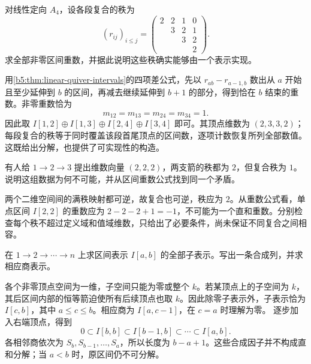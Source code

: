 \begin{exercise}\label{b5:ex:09-a4-rank-table}
	对线性定向 \(A_4\)，设各段复合的秩为
	\[
		(r_{ij})_{i\leq j}=
		\begin{pmatrix}
			2&2&1&0\\
			&3&2&1\\
			& &3&2\\
			& & &2
		\end{pmatrix}.
	\]
	求全部非零区间重数，并据此说明这些秩确实能够由一个表示实现。
\end{exercise}
\begin{solution}
	用\cref{b5:thm:linear-quiver-intervals}的四项差公式，先以 \(r_{ab}-r_{a-1,b}\) 数出从 \(a\) 开始且至少延伸到 \(b\) 的区间，再减去继续延伸到 \(b+1\) 的部分，得到恰在 \(b\) 结束的重数。非零重数恰为
	\[
		m_{12}=m_{13}=m_{24}=m_{34}=1.
	\]
	因此取 \(I[1,2]\oplus I[1,3]\oplus I[2,4]\oplus I[3,4]\) 即可。其顶点维数为 \((2,3,3,2)\)；每段复合的秩等于同时覆盖该段首尾顶点的区间数，逐项计数恢复所列全部数值。这既给出分解，也提供了可实现性的构造。
\end{solution}

\begin{exercise}\label{b5:ex:09-impossible-ranks}
	有人给 \(1\to2\to3\) 提出维数向量 \((2,2,2)\)，两支箭的秩都为 \(2\)，但复合秩为 \(1\)。说明这组数据为何不可能，并从区间重数公式找到同一个矛盾。
\end{exercise}
\begin{solution}
	两个二维空间间的满秩映射都可逆，故复合也可逆，秩应为 \(2\)。从重数公式看，单点区间 \(I[2,2]\) 的重数应为 \(2-2-2+1=-1\)，不可能为一个直和重数。分别检查每个秩不超过定义域和值域维数，只给出了必要条件，尚未保证不同复合之间相容。
\end{solution}

\begin{exercise}\label{b5:ex:09-interval-submodules}
	在 \(1\to2\to\cdots\to n\) 上求区间表示 \(I[a,b]\) 的全部子表示。写出一条合成列，并求相应商表示。
\end{exercise}
\begin{solution}
	各个非零顶点空间为一维，子空间只能为零或整个 \(k\)。若某顶点上的子空间为 \(k\)，其后区间内部的恒等箭迫使所有后续顶点也取 \(k\)。因此除零子表示外，子表示恰为 \(I[c,b]\)，其中 \(a\leq c\leq b\)。相应商为 \(I[a,c-1]\)，在 \(c=a\) 时理解为零。 逐步加入右端顶点，得到
	\[
		0\subset I[b,b]\subset I[b-1,b]\subset\cdots\subset I[a,b].
	\]
	各相邻商依次为 \(S_b,S_{b-1},\ldots,S_a\)，所以长度为 \(b-a+1\)。这些合成因子并不构成直和分解；当 \(a<b\) 时，原区间仍不可分解。
\end{solution}

